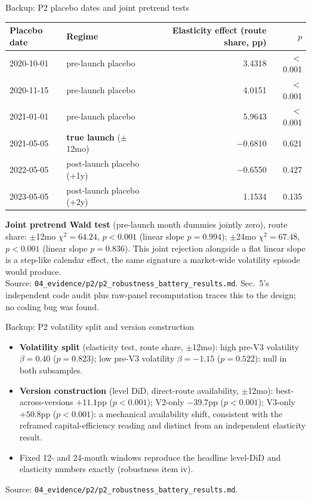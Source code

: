\documentclass[aspectratio=169]{beamer}
\begin{document}
\begin{frame}{Backup: P2 placebo dates and joint pretrend tests}
  \footnotesize
  \begin{center}
  \begin{tabular}{@{}l l r r@{}}
    \toprule
    Placebo date & Regime & Elasticity effect (route share, pp) & $p$ \\
    \midrule
    2020-10-01 & pre-launch placebo & 3.4318 & $<$0.001 \\
    2020-11-15 & pre-launch placebo & 4.0151 & $<$0.001 \\
    2021-01-01 & pre-launch placebo & 5.9643 & $<$0.001 \\
    2021-05-05 & \textbf{true launch} ($\pm$12mo) & $-$0.6810 & 0.621 \\
    2022-05-05 & post-launch placebo (+1y) & $-$0.6550 & 0.427 \\
    2023-05-05 & post-launch placebo (+2y) & 1.1534 & 0.135 \\
    \bottomrule
  \end{tabular}
  \end{center}
  \vspace{0.5em}
  \textbf{Joint pretrend Wald test} (pre-launch month dummies jointly zero), route share: $\pm$12mo $\chi^2=64.24$, $p<0.001$ (linear slope $p=0.994$); $\pm$24mo $\chi^2=67.48$, $p<0.001$ (linear slope $p=0.836$). This joint rejection alongside a flat linear slope is a step-like calendar effect, the same signature a market-wide volatility episode would produce.\\
  {\scriptsize Source: \texttt{04\_evidence/p2/p2\_robustness\_battery\_results.md}. Sec.\ 5's independent code audit plus raw-panel recomputation traces this to the design; no coding bug was found.}
\end{frame}

\begin{frame}{Backup: P2 volatility split and version construction}
  \footnotesize
  \begin{itemize}
    \item \textbf{Volatility split} (elasticity test, route share, $\pm$12mo): high pre-V3 volatility $\beta=0.40$ ($p=0.823$); low pre-V3 volatility $\beta=-1.15$ ($p=0.522$): null in both subsamples.
    \item \textbf{Version construction} (level DiD, direct-route availability, $\pm$12mo): best-across-versions $+11.1$pp ($p<0.001$); V2-only $-39.7$pp ($p<0.001$); V3-only $+50.8$pp ($p<0.001$): a mechanical availability shift, consistent with the reframed capital-efficiency reading and distinct from an independent elasticity result.
    \item Fixed 12- and 24-month windows reproduce the headline level-DiD and elasticity numbers exactly (robustness item iv).
  \end{itemize}
  {\scriptsize Source: \texttt{04\_evidence/p2/p2\_robustness\_battery\_results.md}.}
\end{frame}
\end{document}
